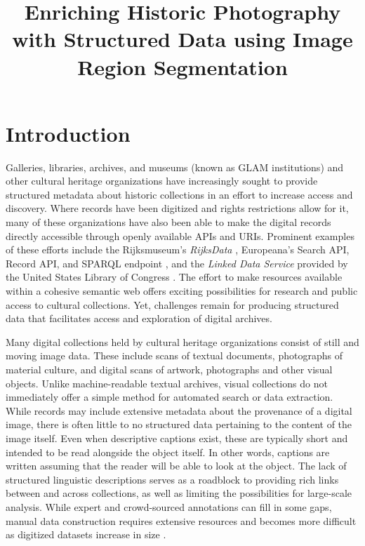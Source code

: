 \documentclass[10pt, a4paper]{article}
\title{\textbf{Enriching Historic Photography with Structured Data
using Image Region Segmentation}}
\begin{document}
\maketitleabstract

\section{Introduction}

Galleries, libraries, archives, and museums (known as GLAM institutions) and
other cultural heritage organizations have
increasingly sought to provide structured metadata about historic collections
in an effort to increase access and discovery. Where records have been
digitized and rights restrictions allow for it, many of these organizations
have also been able to make the digital records directly accessible through
openly available APIs and URIs. Prominent examples of these efforts include the
Rijksmuseum's \textit{RijksData} \cite{dijkshoorn2018rijksmuseum}, Europeana's
Search API, Record API, and SPARQL endpoint \cite{concordia2009not}, and the
\textit{Linked Data Service} provided by the United States Library of Congress
\cite{zimmer2015twitter}. The effort to make resources available
within a cohesive semantic web offers exciting possibilities for research and
public access to cultural collections. Yet, challenges remain for producing
structured data that facilitates access and exploration of digital archives.

Many digital collections held by cultural heritage organizations consist of
still and moving image data. These include scans of textual documents,
photographs of material culture, and digital scans of artwork,
photographs and other visual objects. Unlike machine-readable textual archives,
visual collections do not immediately offer a simple method for automated
search or data extraction. While records may include extensive metadata
about the provenance of a digital image, there is often little to no structured data
pertaining to the content of the image itself. Even when descriptive captions
exist, these are typically short and intended to be read alongside the object itself.
In other words, captions are written assuming that the reader will be able to look
at the object. The lack of
structured linguistic descriptions serves as a roadblock to providing rich links
between and across collections, as well as limiting the possibilities for
large-scale analysis. While expert and crowd-sourced annotations
can fill in some gaps, manual data construction requires extensive resources
and becomes more difficult as digitized datasets increase in size
\cite{seitsonen2017crowdsourcing}.
\end{document}
